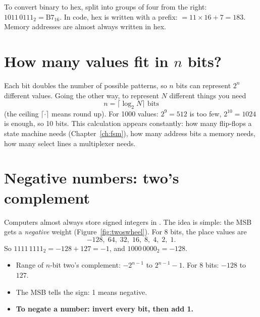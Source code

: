 To convert binary to hex, split into groups of four from the right: $1011\,0111_2 = \text{B7}_{16}$. In code, hex is written with a  prefix:  $= 11\times16 + 7 = 183$. Memory addresses are almost always written in hex.

\section{How many values fit in $n$ bits?}

Each bit doubles the number of possible patterns, so $n$ bits can represent $2^n$ different values. Going the other way, to represent $N$ different things you need
\[
  n = \lceil \log_2 N \rceil \text{ bits}
\]
(the ceiling $\lceil\cdot\rceil$ means round up). For 1000 values: $2^9 = 512$ is too few, $2^{10} = 1024$ is enough, so 10 bits. This calculation appears constantly: how many flip-flops a state machine needs (Chapter~\ref{ch:fsm}), how many address bits a memory needs, how many select lines a multiplexer needs.

\section{Negative numbers: two's complement}
\label{sec:twos}

Computers almost always store signed integers in . The idea is simple: the MSB gets a \emph{negative} weight (Figure~\ref{fig:twoswheel}). For 8 bits, the place values are
\[
  -128,\; 64,\; 32,\; 16,\; 8,\; 4,\; 2,\; 1.
\]
So $1111\,1111_2 = -128 + 127 = -1$, and $1000\,0000_2 = -128$.

\begin{itemize}
  \item Range of $n$-bit two's complement: $-2^{n-1}$ to $2^{n-1}-1$. For 8 bits: $-128$ to $127$.
  \item The MSB tells the sign: 1 means negative.
  \item \textbf{To negate a number: invert every bit, then add 1.}
\end{itemize}

